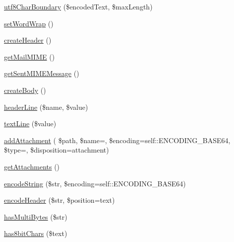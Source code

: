 \begin{DoxyCompactItemize}
\item 
\hyperlink{classPHPMailer_1_1PHPMailer_1_1PHPMailer_abc9948dedc04830eaea5462c0ade83ad}{utf8\+Char\+Boundary} (\$encoded\+Text, \$max\+Length)
\item 
\hyperlink{classPHPMailer_1_1PHPMailer_1_1PHPMailer_a1845ba64be41006391b0ae636a7062d2}{set\+Word\+Wrap} ()
\item 
\hyperlink{classPHPMailer_1_1PHPMailer_1_1PHPMailer_aabb26953f448e8f3eebfba873675f62b}{create\+Header} ()
\item 
\hyperlink{classPHPMailer_1_1PHPMailer_1_1PHPMailer_aa0e0b197b8f4049f53c16c600ca1cbb2}{get\+Mail\+M\+I\+ME} ()
\item 
\hyperlink{classPHPMailer_1_1PHPMailer_1_1PHPMailer_a8c4c21e2c6194b01ef2766c2c5c46cb8}{get\+Sent\+M\+I\+M\+E\+Message} ()
\item 
\hyperlink{classPHPMailer_1_1PHPMailer_1_1PHPMailer_a7a1ec44917d07353f39bec4b38e64879}{create\+Body} ()
\item 
\hyperlink{classPHPMailer_1_1PHPMailer_1_1PHPMailer_aeeb8581cfd5de4ed43501809b1d9c6ff}{header\+Line} (\$name, \$value)
\item 
\hyperlink{classPHPMailer_1_1PHPMailer_1_1PHPMailer_a42b7e0832b8fc3d08f400973a246bc03}{text\+Line} (\$value)
\item 
\hyperlink{classPHPMailer_1_1PHPMailer_1_1PHPMailer_a1eff2c62d74419dff5b7c0a2f7460e39}{add\+Attachment} ( \$path, \$name=\textquotesingle{}\textquotesingle{}, \$encoding=self\+::\+E\+N\+C\+O\+D\+I\+N\+G\+\_\+\+B\+A\+S\+E64, \$type=\textquotesingle{}\textquotesingle{}, \$disposition=\textquotesingle{}attachment\textquotesingle{})
\item 
\hyperlink{classPHPMailer_1_1PHPMailer_1_1PHPMailer_add1bb7a6ecd0d19bdaab537867dbb024}{get\+Attachments} ()
\item 
\hyperlink{classPHPMailer_1_1PHPMailer_1_1PHPMailer_adf1be0fc8f6568fc5e55a5bdef037b15}{encode\+String} (\$str, \$encoding=self\+::\+E\+N\+C\+O\+D\+I\+N\+G\+\_\+\+B\+A\+S\+E64)
\item 
\hyperlink{classPHPMailer_1_1PHPMailer_1_1PHPMailer_a0d2565d7fed06cf340653885436f93cd}{encode\+Header} (\$str, \$position=\textquotesingle{}text\textquotesingle{})
\item 
\hyperlink{classPHPMailer_1_1PHPMailer_1_1PHPMailer_a2ca3a330020bf44d4e4df096a2f66be2}{has\+Multi\+Bytes} (\$str)
\item 
\hyperlink{classPHPMailer_1_1PHPMailer_1_1PHPMailer_afe16e85960abfd23ea1ac9ea75ae6720}{has8bit\+Chars} (\$text)
\item 

\end{DoxyCompactItemize}
